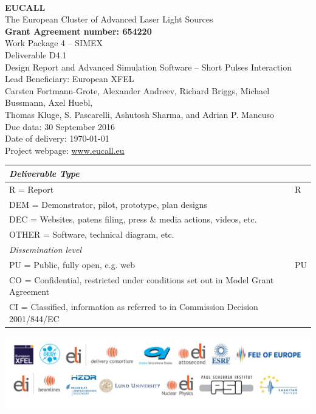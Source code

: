 \documentclass[10pt]{scrartcl}
\begin{document}
\makeatletter
\begin{titlepage}
\thispagestyle{scrheadings}
\begin{center}
$~$\\
\vspace{0cm}
{\Large\textbf{EUCALL}\\[2ex]
The European Cluster of Advanced Laser Light Sources}\\[4ex]
%
{\small\textbf{Grant Agreement number: 654220}}\\[8ex]
%
Work Package 4 -- SIMEX\\[4ex]
%
Deliverable D4.1\\
%
Design Report and Advanced Simulation Software -- Short Pulses
Interaction\\[5ex]
%
Lead Beneficiary: European XFEL\\[5ex]
%
Carsten Fortmann-Grote, Alexander Andreev, Richard Briggs, Michael Bussmann,
  Axel Huebl,\\ Thomas Kluge,
  S. Pascarelli, Ashutosh Sharma, and Adrian P. Mancuso\\[4ex]
%
Due data: 30 September 2016\\
Date of delivery: \today \\[4ex]
%
Project webpage: \url{www.eucall.eu}\\[6ex]
%
{%
\small
\begin{tabular}{|l|l|}
  \hline
  \multicolumn{2}{|l|}{ \textit{Deliverable Type} } \\
  \hline
  R = Report\hfill & R \\
  DEM = Demonstrator, pilot, prototype, plan designs & \\
  DEC = Websites, patens filing, press \& media actions, videos, etc. & \\
  OTHER = Software, technical diagram, etc. & \\
  \hline
  \multicolumn{2}{|l|}{\textit{Dissemination level}} \\
  \hline
  PU = Public, fully open, e.g. web & PU \\
  CO = Confidential, restricted under conditions set out in Model Grant
  Agreement\hspace*{17ex}\  & \\
  CI = Classified, information as referred to in Commission Decision 2001/844/EC
  & \\
  \hline
\end{tabular}
}

\end{center}
%
\vfill
\includegraphics[width=\textwidth]{./PartnerLogos.pdf}
\normalfont
\end{titlepage}
\makeatother
\end{document}
